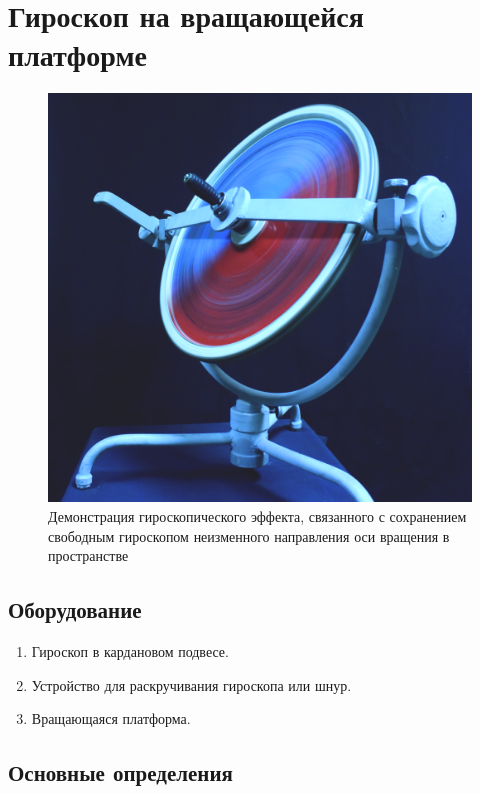 \documentclass[All.tex]{subfiles}
\begin{document}
	

		\section{Гироскоп на вращающейся платформе}
	
	\begin{figure}[H] 	
		\centering 	
		\includegraphics[width=0.7\linewidth]{gyro-1.png}
		\caption{Демонстрация гироскопического эффекта, связанного с сохранением свободным гироскопом неизменного направления оси вращения в пространстве}
		\label{gyro-1}
	\end{figure}
	
	\subsection*{\textcolor{PineGreen}{Оборудование}}

			\begin{enumerate} 
			\item Гироскоп в кардановом подвесе.
			\item Устройство для раскручивания гироскопа или шнур.
			\item Вращающаяся платформа.
		\end{enumerate}


		\subsection*{\textcolor{PineGreen}{Основные определения}}
		
\end{document}
